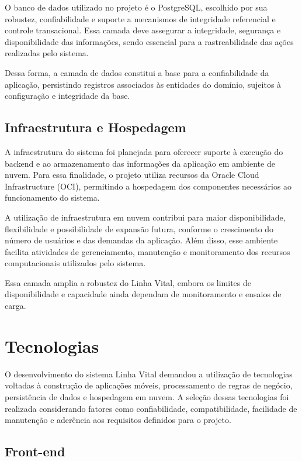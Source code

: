 O banco de dados utilizado no projeto é o PostgreSQL, escolhido por sua robustez, confiabilidade e suporte a mecanismos de integridade referencial e controle transacional. Essa camada deve assegurar a integridade, segurança e disponibilidade das informações, sendo essencial para a rastreabilidade das ações realizadas pelo sistema.

Dessa forma, a camada de dados constitui a base para a confiabilidade da aplicação, persistindo registros associados às entidades do domínio, sujeitos à configuração e integridade da base.

\subsection{Infraestrutura e Hospedagem}

A infraestrutura do sistema foi planejada para oferecer suporte à execução do backend e ao armazenamento das informações da aplicação em ambiente de nuvem. Para essa finalidade, o projeto utiliza recursos da Oracle Cloud Infrastructure (OCI), permitindo a hospedagem dos componentes necessários ao funcionamento do sistema.

A utilização de infraestrutura em nuvem contribui para maior disponibilidade, flexibilidade e possibilidade de expansão futura, conforme o crescimento do número de usuários e das demandas da aplicação. Além disso, esse ambiente facilita atividades de gerenciamento, manutenção e monitoramento dos recursos computacionais utilizados pelo sistema.

Essa camada amplia a robustez do Linha Vital, embora os limites de disponibilidade e capacidade ainda dependam de monitoramento e ensaios de carga.



\section{Tecnologias}

O desenvolvimento do sistema Linha Vital demandou a utilização de tecnologias voltadas à construção de aplicações móveis, processamento de regras de negócio, persistência de dados e hospedagem em nuvem. A seleção dessas tecnologias foi realizada considerando fatores como confiabilidade, compatibilidade, facilidade de manutenção e aderência aos requisitos definidos para o projeto.

\subsection{Front-end}

